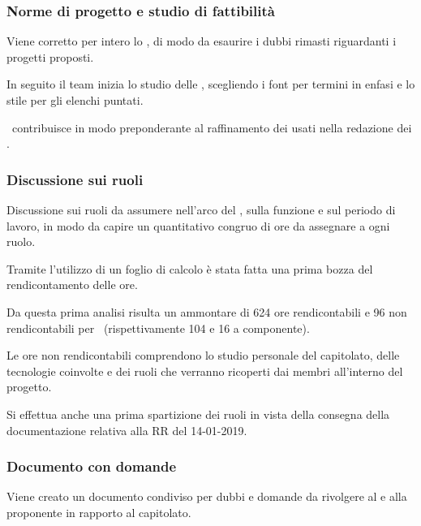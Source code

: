             \subsubsection{Norme di progetto e studio di fattibilità}
            Viene corretto per intero lo \SdF, di modo da esaurire i dubbi rimasti riguardanti i progetti proposti.\par
            In seguito il team inizia lo studio delle \NdP, scegliendo i font per termini in enfasi e lo stile per gli elenchi puntati.\par
            \TG\ contribuisce in modo preponderante al raffinamento dei  usati nella redazione dei .

            \subsubsection{Discussione sui ruoli}
            Discussione sui ruoli da assumere nell'arco del , sulla funzione e sul periodo di lavoro, in modo da capire un quantitativo congruo di ore da assegnare a ogni ruolo.\par
            Tramite l'utilizzo di un foglio di calcolo è stata fatta una prima bozza del rendicontamento delle ore.\par
Da questa prima analisi risulta un ammontare di 624 ore rendicontabili e 96 non rendicontabili per \gruppo\ (rispettivamente 104 e 16 a componente).\par
Le ore non rendicontabili comprendono lo studio personale del capitolato, delle tecnologie coinvolte e dei ruoli che verranno ricoperti dai membri all'interno del progetto.\par
Si effettua anche una prima spartizione dei ruoli in vista della consegna della documentazione relativa alla RR del 14-01-2019.\par

            \subsubsection{Documento con domande}
            Viene creato un documento condiviso per dubbi e domande da rivolgere al {\TV} e alla proponente {\II} in rapporto al capitolato.\par


